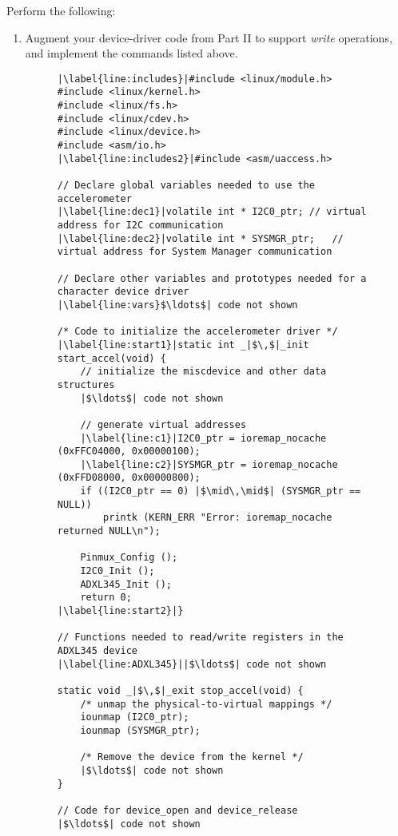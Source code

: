 \documentclass[epsfig,10pt,fullpage]{article}
\begin{document}
\noindent
Perform the following:

\begin{enumerate}
\item Augment your device-driver code from Part II to support {\it write} operations, 
and implement the commands listed above. 
\newpage
\lstset{language=C,numbers=left,escapechar=|}
\begin{figure}[h]
\begin{center}
\begin{minipage}[t]{15 cm}
\begin{lstlisting}[name=dots]
|\label{line:includes}|#include <linux/module.h>
#include <linux/kernel.h>
#include <linux/fs.h>
#include <linux/cdev.h>
#include <linux/device.h>
#include <asm/io.h>
|\label{line:includes2}|#include <asm/uaccess.h>

// Declare global variables needed to use the accelerometer
|\label{line:dec1}|volatile int * I2C0_ptr;	// virtual address for I2C communication
|\label{line:dec2}|volatile int * SYSMGR_ptr;	// virtual address for System Manager communication

// Declare other variables and prototypes needed for a character device driver
|\label{line:vars}$\ldots$| code not shown

/* Code to initialize the accelerometer driver */
|\label{line:start1}|static int _|$\,$|_init start_accel(void) {
	// initialize the miscdevice and other data structures
	|$\ldots$| code not shown

	// generate virtual addresses
	|\label{line:c1}|I2C0_ptr = ioremap_nocache (0xFFC04000, 0x00000100);
	|\label{line:c2}|SYSMGR_ptr = ioremap_nocache (0xFFD08000, 0x00000800);
	if ((I2C0_ptr == 0) |$\mid\,\mid$| (SYSMGR_ptr == NULL))
		printk (KERN_ERR "Error: ioremap_nocache returned NULL\n");

	Pinmux_Config ();
	I2C0_Init ();
	ADXL345_Init ();
	return 0;
|\label{line:start2}|}

// Functions needed to read/write registers in the ADXL345 device
|\label{line:ADXL345}||$\ldots$| code not shown

static void _|$\,$|_exit stop_accel(void) {
	/* unmap the physical-to-virtual mappings */
	iounmap (I2C0_ptr);
	iounmap (SYSMGR_ptr);

	/* Remove the device from the kernel */
	|$\ldots$| code not shown
}

// Code for device_open and device_release
|$\ldots$| code not shown


\end{lstlisting}
\end{minipage}
\end{center}
\end{figure}
\end{enumerate}
\end{document}
